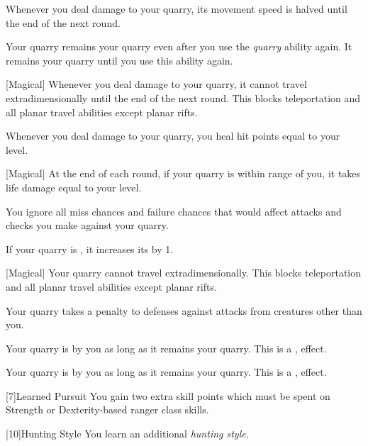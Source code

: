             Whenever you deal damage to your quarry, its movement speed is halved until the end of the next round.

            Your quarry remains your quarry even after you use the \textit{quarry} ability again.
            It remains your quarry until you use this ability again.

            [Magical]
            Whenever you deal damage to your quarry, it cannot travel extradimensionally until the end of the next round.
            This blocks teleportation and all planar travel abilities except planar rifts.

            Whenever you deal damage to your quarry, you heal hit points equal to your level.

            [Magical]
            At the end of each round, if your quarry is within \rnglong range of you, it takes life damage equal to your level.

            You ignore all miss chances and failure chances that would affect attacks and checks you make against your quarry.

            If your quarry is , it increases its  by 1.

            [Magical]
            Your quarry cannot travel extradimensionally.
            This blocks teleportation and all planar travel abilities except planar rifts.

            Your quarry takes a  penalty to defenses against attacks from creatures other than you.

            Your quarry is \taunted by you as long as it remains your quarry.
            This is a ,  effect.

            Your quarry is \frightened by you as long as it remains your quarry.
            This is a ,  effect.

            [7]{Learned Pursuit} You gain two extra skill points which must be spent on Strength or Dexterity-based ranger class skills.

            [10]{Hunting Style}
            You learn an additional \textit{hunting style}.


